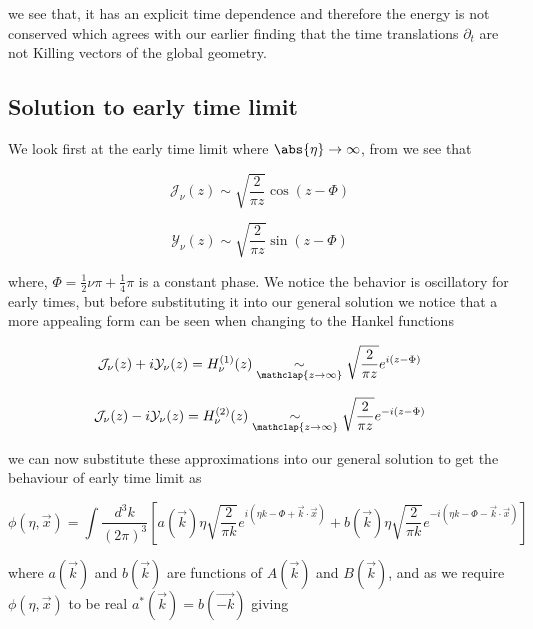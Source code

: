 \documentclass[a4paper,11pt]{article}
\newcommand\underrel[3][]{\mathrel{\mathop{#3}\limits_{%
      \ifx c#1\relax\mathclap{#2}\else#2\fi}}}
\numberwithin{equation}{section}
\numberwithin{figure}{section}
\begin{document}
\begin{large}
we see that, it has an explicit time dependence and therefore the energy is not conserved which agrees with our earlier finding that the time translations $\partial_t$ are not Killing vectors of the global geometry.


\subsection{Solution to early time limit}

We look first at the early time limit where $\abs{\eta}\rightarrow\infty$, from \cite{nist-dlmf} we see that 

\begin{equation}
\label{J(z) z>>1}    
    \mathcal{J}_\nu(z)\sim \sqrt{\frac{2}{\pi z}}\cos(z-\Phi)
\end{equation}

\begin{equation}
\label{Y(z) z>>1}    
    \mathcal{Y}_\nu(z)\sim \sqrt{\frac{2}{\pi z}}\sin(z-\Phi)
\end{equation}

where, $\Phi=\frac{1}{2}\nu\pi+\frac{1}{4}\pi$ is a constant phase. We notice the behavior is oscillatory for early times, but before substituting it into our general solution we notice that a more appealing form can be seen when changing to the Hankel functions


\begin{equation}
\label{H1 z>>1}    
    \mathcal{J}_\nu(z)+i\mathcal{Y}_\nu(z)=H^{(1)}_\nu(z)\underrel[c]{z\to \infty}{\sim}\sqrt{\frac{2}{\pi z}}e^{i(z-\Phi)}
\end{equation}

\begin{equation}
\label{H2 z>>1}    
    \mathcal{J}_\nu(z)-i\mathcal{Y}_\nu(z)=H^{(2)}_\nu(z)\underrel[c]{z\to \infty}{\sim}\sqrt{\frac{2}{\pi z}}e^{-i(z-\Phi)}
\end{equation}

we can now substitute these approximations into our general solution to get the behaviour of early time limit as

\begin{equation}
\label{genKGsol1 eta>>1}    
    \phi(\eta,\Vec{x})=\int \frac{d^3k}{(2\pi)^3}\left[a(\Vec{k})\eta\sqrt{\frac{2}{\pi k}}e^{i(\eta k-\Phi+\Vec{k}\cdot\Vec{x})}+b(\Vec{k})\eta\sqrt{\frac{2}{\pi k}}e^{-i(\eta k-\Phi-\Vec{k}\cdot\Vec{x})} \right]
\end{equation}

where $a(\Vec{k})$ and $b(\Vec{k})$ are functions of $A(\Vec{k})$ and $B(\Vec{k})$, and as we require $\phi(\eta,\Vec{x})$ to be real $a^*(\Vec{k})=b(\Vec{-k})$ giving


\end{large}
\end{document}
